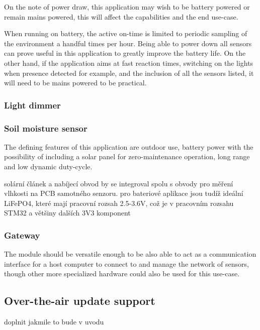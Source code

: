On the note of power draw, this application may wish to be battery powered or remain mains powered, this will affect the capabilities and the end use-case. 

When running on battery, the active on-time is limited to periodic sampling of the environment a handful times per hour. Being able to power down all sensors can prove useful in this application to greatly improve the battery life. On the other hand, if the application aims at fast reaction times, switching on the lights when presence detected for example, and the inclusion of all the sensors listed, it will need to be mains powered to be practical.

\subsubsection{Light dimmer}

\subsubsection{Soil moisture sensor}
The defining features of this application are outdoor use, battery power with the possibility of including a solar panel for zero-maintenance operation, long range and low dynamic duty-cycle.

solární článek a nabíjecí obvod by se integroval spolu s obvody pro měření vlhkosti na PCB samotného senzoru. pro bateriové aplikace jsou tudíž ideální LiFePO4, které mají pracovní rozsah 2.5-3.6V, což je v pracovním rozsahu STM32 a většiny dalších 3V3 komponent

\subsubsection{Gateway}
The module should be versatile enough to be also able to act as a communication interface for a host computer to connect to and manage the network of sensors, though other more specialized hardware could also be used for this use-case.

\subsection{Over-the-air update support}

doplnit jakmile to bude v uvodu

